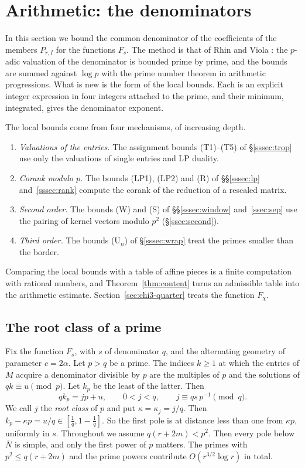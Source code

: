 \documentclass[11pt]{amsart}
\theoremstyle{definition}
\theoremstyle{remark}
\numberwithin{equation}{section}
\begin{document}
\section{Arithmetic: the denominators}\label{sec:content}

In this section we bound the common denominator of the coefficients of the members $P_{r,I}$ for the functions $F_s$.
The method is that of Rhin and Viola \cite{RhinViola96,RhinViola01}: the $p$-adic valuation of the denominator is bounded
prime by prime, and the bounds are summed against $\log p$ with the prime number theorem in arithmetic progressions.
What is new is the form of the local bounds. Each is an explicit integer expression in four integers attached to the
prime, and their minimum, integrated, gives the denominator exponent.

The local bounds come from four mechanisms, of increasing depth.
\begin{enumerate}[label=(\alph*)]
\item \emph{Valuations of the entries.} The assignment bounds (T1)--(T5) of \S\ref{sssec:trop} use only the
 valuations of single entries and LP duality.
\item \emph{Corank modulo $p$.} The bounds (LP1), (LP2) and (R) of \S\S\ref{sssec:lp} and~\ref{sssec:rank} compute the
 corank of the reduction of a rescaled matrix.
\item \emph{Second order.} The bounds (W) and (S) of \S\S\ref{sssec:window} and~\ref{ssec:sep} use the pairing of kernel
 vectors modulo $p^2$ (\S\ref{ssec:second}).
\item \emph{Third order.} The bounds (U$_n$) of \S\ref{sssec:wrap} treat the primes smaller than the border.
\end{enumerate}
Comparing the local bounds with a table of affine pieces is a finite computation with rational numbers, and
Theorem~\ref{thm:content} turns an admissible table into the arithmetic estimate. Section~\ref{sec:chi3-quarter} treats the
function $F_\chi$.

\subsection{The root class of a prime}
Fix the function $F_s$, with $s$ of denominator $q$, and the alternating geometry of parameter $c=2\alpha$.
Let $p>q$ be a prime. The indices $k\ge1$ at which the entries of $M$ acquire a denominator divisible by $p$ are the
multiples of $p$ and the solutions of $qk\equiv u\pmod p$. Let $k_p$ be the least of the latter. Then
\[
 qk_p=jp+u,\qquad 0<j<q,\qquad j\equiv qs\,p^{-1}\pmod q .
\]
We call $j$ the \emph{root class} of $p$ and put $\kappa=\kappa_j=j/q$. Then $k_p-\kappa p=u/q\in[\frac1q,1-\frac1q]$. So
the first pole is at distance less than one from $\kappa p$, uniformly in $s$. Throughout we assume $q(r+2m)<p^2$. Then
every pole below $\bar N$ is simple, and only the first power of $p$ matters. The primes with $p^2\le q(r+2m)$ and the prime
powers contribute $O(r^{3/2}\log r)$ in total.
\end{document}
